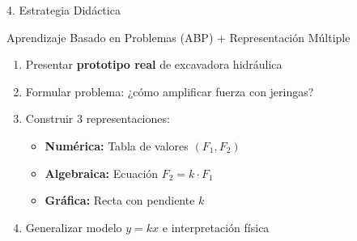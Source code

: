 \documentclass[aspectratio=169,11pt]{beamer}
\newcommand{\stepbeat}[2]{}
\newcommand{\highlight}[1]{\textcolor{iiiepegold}{\textbf{#1}}}
\begin{document}
\begin{frame}{4. Estrategia Didáctica}
  \begin{block}{Aprendizaje Basado en Problemas (ABP) + Representación Múltiple}
    \begin{enumerate}
      \item Presentar \highlight{prototipo real} de excavadora hidráulica
      \item Formular problema: ¿cómo amplificar fuerza con jeringas?
      \item Construir 3 representaciones:
        \begin{itemize}
          \item \textbf{Numérica:} Tabla de valores $(F_1, F_2)$
          \item \textbf{Algebraica:} Ecuación $F_2 = k \cdot F_1$
          \item \textbf{Gráfica:} Recta con pendiente $k$
        \end{itemize}
      \item Generalizar modelo $y = kx$ e interpretación física
    \end{enumerate}
  \end{block}
  \only<1>{\stepbeat{frame_estrategia}{abp}}
\end{frame}
\end{document}
